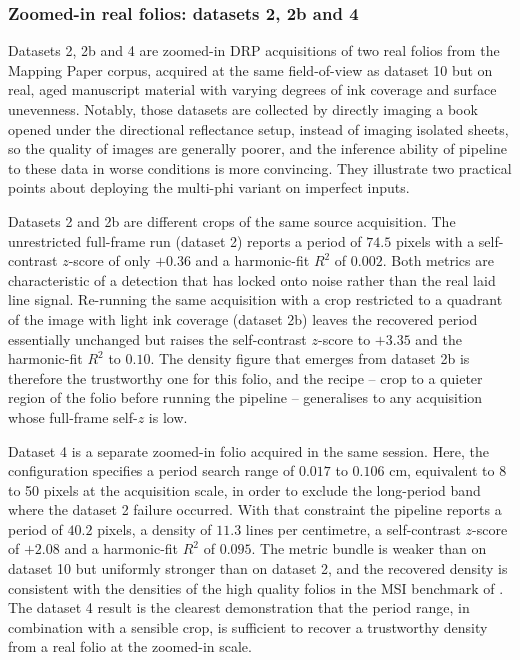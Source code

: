 \subsubsection{Zoomed-in real folios: datasets 2, 2b and 4}
\label{sec:benchmark:drp:zoomed}

Datasets 2, 2b and 4 are zoomed-in DRP acquisitions of two real
folios from the Mapping Paper corpus, acquired at the same
field-of-view as dataset 10 but on real, aged manuscript material with
varying degrees of ink coverage and surface unevenness. 
Notably, those datasets are collected by directly imaging a book opened
under the directional reflectance setup, instead of imaging isolated sheets,
so the quality of images are generally poorer, and the inference ability of pipeline
to these data in worse conditions is more convincing. They
illustrate two practical points about deploying the multi-phi
variant on imperfect inputs.

Datasets 2 and 2b are different crops of the same source
acquisition. The unrestricted full-frame run (dataset 2) reports
a period of $74.5$ pixels with a self-contrast $z$-score of only
$+0.36$ and a harmonic-fit $R^{2}$ of $0.002$. Both metrics are
characteristic of a detection that has locked onto noise rather
than the real laid line signal. Re-running the same acquisition
with a crop restricted to a quadrant of the image with light ink
coverage (dataset 2b) leaves the recovered period essentially
unchanged but raises the self-contrast $z$-score to $+3.35$ and
the harmonic-fit $R^{2}$ to $0.10$. The density figure that
emerges from dataset 2b is therefore the trustworthy one for this
folio, and the recipe -- crop to a quieter region of the folio
before running the pipeline -- generalises to any acquisition
whose full-frame self-$z$ is low.

Dataset 4 is a separate zoomed-in folio acquired in the same
session. Here, the configuration specifies a period search range
of $0.017$ to $0.106$ cm, equivalent to 8 to 50 pixels at the
acquisition scale, in order to exclude the long-period band where
the dataset 2 failure occurred. With that constraint the pipeline
reports a period of $40.2$ pixels, a density of $11.3$ lines per
centimetre, a self-contrast $z$-score of $+2.08$ and a
harmonic-fit $R^{2}$ of $0.095$. The metric bundle is weaker than
on dataset 10 but uniformly stronger than on dataset 2, and the
recovered density is consistent with the densities of the
high quality folios in the MSI benchmark of
. The dataset 4 result is the
clearest demonstration that the period range, in
combination with a sensible crop, is sufficient to recover a
trustworthy density from a real folio at the zoomed-in scale.


